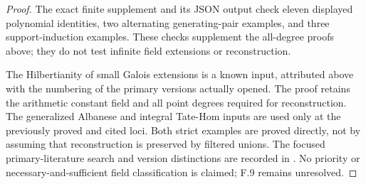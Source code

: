 \begin{proof}
The exact finite supplement
 and its JSON output
check eleven displayed polynomial identities, two alternating
generating-pair examples, and three support-induction examples.
These checks supplement the all-degree proofs above; they do not
test infinite field extensions or reconstruction.

The Hilbertianity of small Galois extensions is a known input,
attributed above with the numbering of the primary versions
actually opened. The proof retains the arithmetic constant
field and all point degrees required for reconstruction.
The generalized Albanese and integral Tate-Hom inputs are used
only at the previously proved and cited loci.
Both strict examples are proved directly, not by assuming that
reconstruction is preserved by filtered unions.
The focused primary-literature search and version distinctions
are recorded in .
No priority or necessary-and-sufficient field classification is
claimed; F.9 remains unresolved.
\end{proof}
